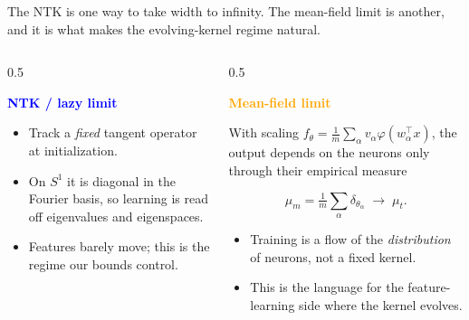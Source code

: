 \documentclass[aspectratio=169,9pt]{beamer}
\begin{document}
\begin{frame}[noframenumbering]
	{\textcolor{muted}{The NTK is one way to take width to infinity. The mean-field limit is another, and it is what makes the evolving-kernel regime natural.}}

	\vspace{2mm}
	\begin{columns}[T,onlytextwidth]
		\begin{column}{0.5\textwidth}
			\begin{bluecard}[height=42mm]
				{\scriptsize\textcolor{blue}{\bfseries NTK / lazy limit}}\par\vspace{1mm}
				\begin{itemize}\tightlist\scriptsize
					\item Track a \emph{fixed} tangent operator at initialization.
					\item On $S^1$ it is diagonal in the Fourier basis, so learning is read off eigenvalues and eigenspaces.
					\item Features barely move; this is the regime our bounds control.
				\end{itemize}
			\end{bluecard}
		\end{column}
		\begin{column}{0.5\textwidth}
			\begin{orangecard}[height=42mm]
				{\scriptsize\textcolor{orange}{\bfseries Mean-field limit}}\par\vspace{1mm}
				{\scriptsize With scaling $f_\theta=\tfrac1m\sum_\alpha v_\alpha\varphi(w_\alpha^\top x)$, the output depends on the neurons only through their empirical measure}\par\vspace{-1.5mm}
				{\scriptsize
					\[
						\mu_m=\tfrac1m\textstyle\sum_\alpha \delta_{\theta_\alpha}\;\longrightarrow\;\mu_t .
					\]
				}
				\vspace{-2mm}\par
				\begin{itemize}\tightlist\scriptsize
					\item Training is a flow of the \emph{distribution} of neurons, not a fixed kernel.
					\item This is the language for the feature-learning side where the kernel evolves.
				\end{itemize}
			\end{orangecard}
		\end{column}
	\end{columns}
\end{frame}
\end{document}
